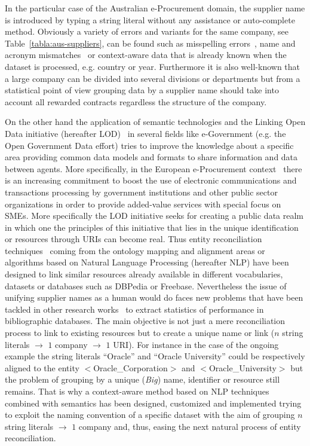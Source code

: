 \documentclass{llncs}
\begin{document}
In the particular case of the Australian e-Procurement domain, the supplier name is introduced by typing a string literal without any assistance or 
auto-complete method. Obviously a variety of errors and variants for the same company, see Table~\ref{tabla:aus-suppliers}, 
can be found such as misspelling errors~\cite{NorvigSpelling,StanfordSpelling}, name and acronym mismatches~\cite{Yeates99automaticextraction,Ratinov:2004:AES:1025132.1026366} 
or context-aware data that is already known when the dataset is processed, e.g. country or year. Furthermore it is also well-known 
that a large company can be divided into several divisions or departments but from a statistical point of view grouping data by a supplier name 
should take into account all rewarded contracts regardless the structure of the company.

On the other hand the application of semantic technologies and the Linking Open Data initiative (hereafter LOD)~\cite{Berners-Lee-2006,Heath_Bizer_2011}  
in several fields like e-Government (e.g. the Open Government Data effort) tries to improve the knowledge about a specific area providing 
common data models and formats to share information and data between agents. More specifically, in the European e-Procurement 
context~\cite{e-Proc-map-paper} there is an increasing commitment to boost the use of electronic communications and transactions 
processing by government institutions and other public sector organizations in order to provide added-value services with special focus on SMEs. 
More specifically the LOD initiative seeks for creating a public data realm in which one the principles of this initiative that lies in the 
unique identification or resources through URIs can become real. Thus entity reconciliation techniques~\cite{Serimi,conf/www/MaaliCP11} 
coming from the ontology mapping and alignment areas or algorithms based on Natural Language Processing (hereafter NLP) have been 
designed to link similar resources already available in different vocabularies, datasets or databases such as DBPedia or Freebase. 
Nevertheless the issue of unifying supplier names as a human would do faces new problems that have been tackled in 
other research works~\cite{Galvez2006} to extract statistics of performance in bibliographic databases. The main objective is not just a 
mere reconciliation process to link to existing resources but to create a unique name or link ($n$ string literals $\to$ $1$ company $\to$ $1$ URI). 
For instance in the case of the ongoing example the string literals ``Oracle'' and ``Oracle University'' could be respectively aligned to the entity $<$Oracle\_Corporation$>$ and $<$Oracle\_University$>$ but 
the problem of grouping by a unique (\textit{Big}) name, identifier or resource still remains. That is why a context-aware method based on NLP 
techniques combined with semantics has been designed, customized and implemented trying to exploit the naming convention of a specific dataset with the aim 
of grouping $n$ string literals $\to$ $1$ company and, thus, easing the next natural process of entity reconciliation.
\end{document}
